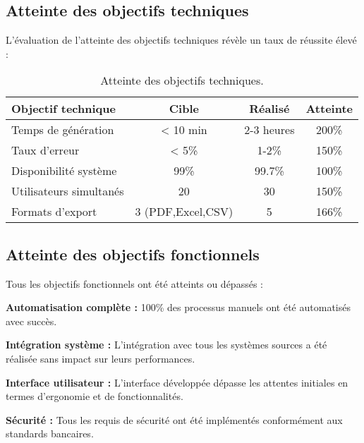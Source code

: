 \subsection{Atteinte des objectifs techniques}

L'évaluation de l'atteinte des objectifs techniques révèle un taux de réussite élevé :

\begin{table}[h]
    \centering
    \begin{tabular}{|l|c|c|c|}
        \hline
        \textbf{Objectif technique} & \textbf{Cible}    & \textbf{Réalisé} & \textbf{Atteinte} \\ \hline
        Temps de génération         & < 10 min          & 2-3 heures       & 200\%             \\ \hline
        Taux d'erreur               & < 5\%             & 1-2\%            & 150\%             \\ \hline
        Disponibilité système       & 99\%              & 99.7\%           & 100\%             \\ \hline
        Utilisateurs simultanés     & 20                & 30               & 150\%             \\ \hline
        Formats d'export            & 3 (PDF,Excel,CSV) & 5                & 166\%             \\ \hline
    \end{tabular}
    \caption{Atteinte des objectifs techniques.}
    \label{tab:objectifs-techniques}
\end{table}

\subsection{Atteinte des objectifs fonctionnels}

Tous les objectifs fonctionnels ont été atteints ou dépassés :

\medskip

\textbf{Automatisation complète :} 100\% des processus manuels ont été automatisés avec succès.

\textbf{Intégration système :} L'intégration avec tous les systèmes sources a été réalisée sans impact sur leurs performances.

\textbf{Interface utilisateur :} L'interface développée dépasse les attentes initiales en termes d'ergonomie et de fonctionnalités.

\textbf{Sécurité :} Tous les requis de sécurité ont été implémentés conformément aux standards bancaires.

